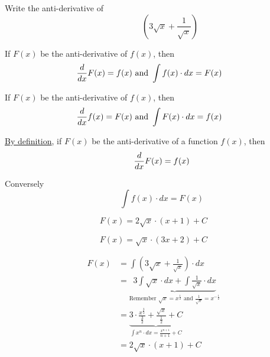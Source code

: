 \documentclass[14pt,fleqn]{extarticle}
\newcommand\fx{ \left(3\sqrt{x} + \frac{1}{\sqrt{x}} \right)}
\begin{document}
\begin{question}
	\statement 
    
    Write the anti-derivative of 
    \[ \qquad\qquad  \fx \] 
    
    \begin{step}
  \begin{options} 
     \correct 
       
     If $F(x)$ be the anti-derivative of $f(x)$, then 
     \begin{align}
	     \frac{d}{dx} F(x) &= f(x) \text{ and } \int f(x)\cdot dx = F(x) 
\end{align}
     \incorrect
        
          
     If $F(x)$ be the anti-derivative of $f(x)$, then 
     \begin{align}
	     \frac{d}{dx} f(x) &= F(x) \text{ and } \int F(x)\cdot dx = f(x) 
\end{align}
    \end{options} 
     \reason 
     
     \underline{By definition}, if $F(x)$ be the anti-derivative of a function $f(x)$, then 
     \[ \qquad \frac{d}{dx} F(x) = f(x) \]
     
     Conversely 
     \[ \qquad \int f(x)\cdot dx = F(x) \]
       
\end{step}

\begin{step}
  \begin{options} 
     \correct 
       
       \[ F(x) = 2\sqrt{x}\cdot \left(x+1 \right) + C  \]
     \incorrect
        
      \[ F(x) = \sqrt{x}\cdot \left(3x + 2 \right) + C  \]
    \end{options} 
     \reason 
       
       \begin{align}
	F(x) &= \int \fx\cdot dx \\
	&= \underbrace{3\int \sqrt{x}\cdot dx + \int \frac{1}{\sqrt{x}}\cdot dx}_{\text{Remember } \sqrt{x} = x^{\frac{1}{2}}\text{ and } \frac{1}{\sqrt{x}}= x^{-\frac{1}{2}}} \\ 
	&= \underbrace{3 \cdot \frac{x^{\frac{3}{2}}}{\frac{3}{2}} + \frac{\sqrt{x}}{\frac{1}{2}} + C}_{\int x^n \cdot dx = \frac{x^{n+1}}{n+1} + C} \\
	&= 2\sqrt{x}\cdot \left(x+1 \right) + C 
\end{align}
\end{step}
\end{question} 
\end{document}
